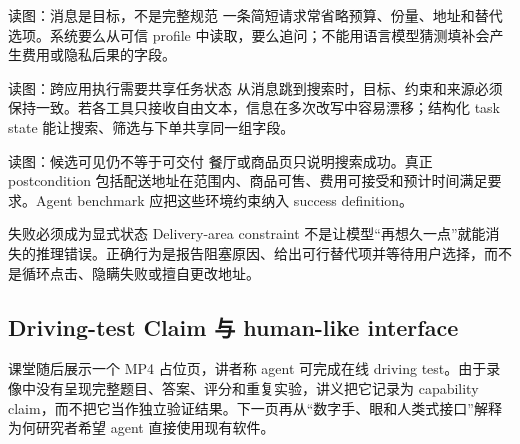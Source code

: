 
\begin{knowledgebox}{读图：消息是目标，不是完整规范}
一条简短请求常省略预算、份量、地址和替代选项。系统要么从可信 profile 中读取，要么追问；不能用语言模型猜测填补会产生费用或隐私后果的字段。
\end{knowledgebox}


\begin{knowledgebox}{读图：跨应用执行需要共享任务状态}
从消息跳到搜索时，目标、约束和来源必须保持一致。若各工具只接收自由文本，信息在多次改写中容易漂移；结构化 task state 能让搜索、筛选与下单共享同一组字段。
\end{knowledgebox}


\begin{knowledgebox}{读图：候选可见仍不等于可交付}
餐厅或商品页只说明搜索成功。真正 postcondition 包括配送地址在范围内、商品可售、费用可接受和预计时间满足要求。Agent benchmark 应把这些环境约束纳入 success definition。
\end{knowledgebox}


\begin{warningbox}{失败必须成为显式状态}
Delivery-area constraint 不是让模型“再想久一点”就能消失的推理错误。正确行为是报告阻塞原因、给出可行替代项并等待用户选择，而不是循环点击、隐瞒失败或擅自更改地址。
\end{warningbox}


\subsection{Driving-test Claim 与 human-like interface}

课堂随后展示一个 MP4 占位页，讲者称 agent 可完成在线 driving test。由于录像中没有呈现完整题目、答案、评分和重复实验，讲义把它记录为 capability claim，而不把它当作独立验证结果。下一页再从“数字手、眼和人类式接口”解释为何研究者希望 agent 直接使用现有软件。

